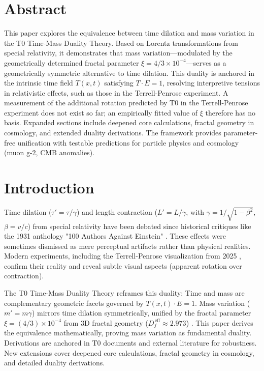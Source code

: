 \section*{Abstract}
		This paper explores the equivalence between time dilation and mass variation in the T0 Time-Mass Duality Theory. Based on Lorentz transformations from special relativity, it demonstrates that mass variation—modulated by the geometrically determined fractal parameter $\xi = 4/3\times10^{-4}$—serves as a geometrically symmetric alternative to time dilation. This duality is anchored in the intrinsic time field $T(x,t)$ satisfying $T \cdot E = 1$, resolving interpretive tensions in relativistic effects, such as those in the Terrell-Penrose experiment. A measurement of the additional rotation predicted by T0 in the Terrell-Penrose experiment does not exist so far; an empirically fitted value of $\xi$ therefore has no basis. Expanded sections include deepened core calculations, fractal geometry in cosmology, and extended duality derivations. The framework provides parameter-free unification with testable predictions for particle physics and cosmology (muon g-2, CMB anomalies).

	
	\section{Introduction}
	Time dilation ($\tau' = \tau / \gamma$) and length contraction ($L' = L / \gamma$, with $\gamma = 1 / \sqrt{1 - \beta^2}$, $\beta = v/c$) from special relativity have been debated since historical critiques like the 1931 anthology "100 Authors Against Einstein" \cite{hundert1931}. These effects were sometimes dismissed as mere perceptual artifacts rather than physical realities. Modern experiments, including the Terrell-Penrose visualization from 2025 \cite{terrell2025}, confirm their reality and reveal subtle visual aspects (apparent rotation over contraction).
	
	The T0 Time-Mass Duality Theory \cite{pascher2025t0} reframes this duality: Time and mass are complementary geometric facets governed by $T(x,t) \cdot E = 1$. Mass variation ($m' = m \gamma$) mirrors time dilation symmetrically, unified by the fractal parameter $\xi = (4/3) \times 10^{-4}$ from 3D fractal geometry ($D_f^{\,\text{eff}} \approx 2.973$) \cite{pascher2025si}. This paper derives the equivalence mathematically, proving mass variation as fundamental duality. Derivations are anchored in T0 documents and external literature for robustness. New extensions cover deepened core calculations, fractal geometry in cosmology, and detailed duality derivations.
	
